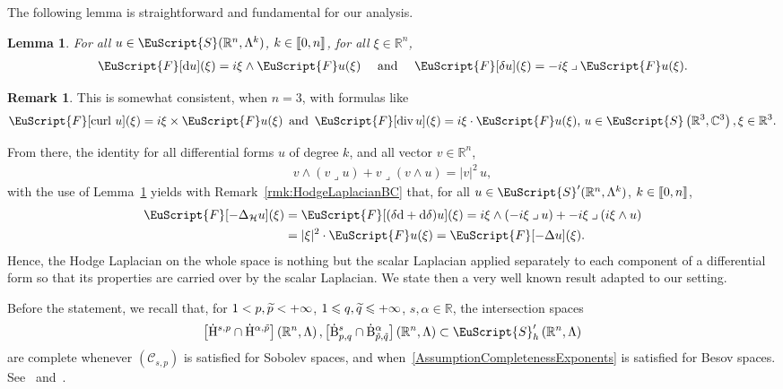 \documentclass[10pt]{amsart}
\newtheorem{lemm}[theo]{Lemma}\newtheorem{prop}[theo]{Proposition}\newtheorem{coro}[theo]{Corollary}\newtheorem{conj}[theo]{Conjecture}
\theoremstyle{definition}\newtheorem{defi}[theo]{Definition}\newtheorem{rema}[theo]{Remark}\newtheorem{exam}[theo]{Example}\newtheorem{exem}[theo]{Example}\newtheorem{nota}[theo]{Notation}
\renewcommand*{\div}{\mathrm{div\,}}
\DeclareMathOperator{\curl}{curl\,}
\newcommand{\bbR}{\mathbb{R}}
\newcommand{\bbC}{\mathbb{C}}
\newcommand{\rmH}{\mathrm{H}}%
\newcommand{\rmB}{\mathrm{B}}
\newcommand{\rmd}{\mathrm{d}}
\newcommand{\clH}{\mathcal{H}}
\newcommand{\clC}{\mathcal{C}}
\newcommand{\eus}{\EuScript}
\newcommand{\llbracket}{\mathopen{[\mkern -2.7mu[}}
\newcommand{\rrbracket}{\mathclose{]\mkern -2.7mu]}}
\newcommand{\llb}{\llbracket}
\newcommand{\rrb}{\rrbracket}
\newcommand{\iprod}{\mathbin{\lrcorner}}
\let\oldtilde\tilde
\renewcommand*{\tilde}[1]{\mathchoice{\widetilde{#1}}{\widetilde{#1}}{\oldtilde{#1}}{\oldtilde{#1}}}
\begin{document}
The following lemma is straightforward and fundamental for our analysis.

\begin{lemm}\label{lem:FundamentalLemmaDiffFormsRn}
For all $u\in\eus{S}(\bbR^n,\Lambda^k)$, $k\in\llb 0,n\rrb$, for all $\xi\in\bbR^n$,
\begin{align*}
\eus{F}[\rmd u](\xi)=i\xi\wedge \eus{F}u(\xi) \quad\text{ and }\quad \eus{F}[\delta u](\xi)=-i\xi\iprod \eus{F}u(\xi) .
\end{align*}
\end{lemm}

\begin{rema}
This is somewhat consistent, when $n=3$, with formulas like
\begin{align*}
\eus{F}[\curl u](\xi) = i\xi\times\eus{F}u(\xi)\,\text{ and }\,\eus{F}[\div u](\xi) = i\xi\cdot\eus{F}u(\xi)\text{, } u\in\eus{S}\left(\bbR^3,\bbC^3\right), \xi \in\bbR^3.
\end{align*}
\end{rema}

From there, the identity for all differential forms $u$ of degree $k$, and all vector $v\in\bbR^n$,
\begin{align*}
v\wedge(v\iprod u) + v\iprod(v\wedge u) = | v|^2 \, u,
\end{align*}
with the use of Lemma~\ref{lem:FundamentalLemmaDiffFormsRn} yields with Remark~\ref{rmk:HodgeLaplacianBC} that, for all $u\in\eus{S}'(\bbR^n,\Lambda^k)$, $k\in\llb 0,n\rrb$,
\begin{align*}
\eus{F}[-\Delta_{\clH} u](\xi)&=\eus{F}[(\delta\rmd + \rmd\delta) u](\xi) = i\xi\wedge(-i\xi\iprod u) + -i\xi\iprod(i\xi\wedge u)\\
&= | \xi|^2 \cdot \eus{F}u(\xi) = \eus{F}[-\Delta u](\xi).
\end{align*}
Hence, the Hodge Laplacian on the whole space is nothing but the scalar Laplacian applied separately to each component of a differential form so that its properties are carried over by the scalar Laplacian. We state then a very well known result adapted to our setting.

Before the statement, we recall that, for $1<p,\Tilde{p}<+\infty$, $1\leqslant q,\Tilde{q}\leqslant +\infty$, $s,\alpha\in\bbR$, the intersection spaces
\begin{align*}
\left[\dot{\rmH}^{s,p}\cap \dot{\rmH}^{\alpha,\tilde{p}}\right]\left(\bbR^n,\Lambda\right),\left[\dot{\rmB}^{s}_{p,q}\cap \dot{\rmB}^{\alpha}_{\tilde{p},\tilde{q}}\right]\left(\bbR^n,\Lambda\right) \subset \eus{S}'_h\left(\bbR^n,\Lambda\right)
\end{align*}
are complete whenever $(\clC_{s,p})$ is satisfied for Sobolev spaces, and when~\eqref{AssumptionCompletenessExponents} is satisfied for Besov spaces. See~\cite[Lemma~2.5]{Gaudin2022} and~\cite[Proposition~2.17]{bookBahouriCheminDanchin}.
\end{document}
